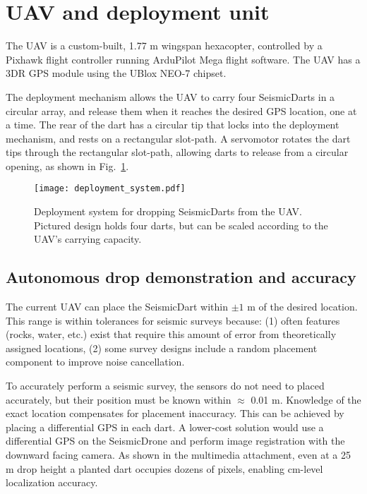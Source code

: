 \section{UAV and deployment unit}\label{sec:DeploymentUnit(UAV)}

The UAV is a custom-built, 1.77 m wingspan hexacopter, controlled by a Pixhawk flight controller running ArduPilot Mega flight software. The UAV has a 3DR GPS module using the UBlox NEO-7 chipset.


 The deployment mechanism allows the UAV to carry four SeismicDarts in a circular array, and release them when it reaches the desired GPS location, one at a time.
 The rear of the dart has a circular tip that locks into the deployment mechanism, and rests on a rectangular slot-path. 
 A servomotor rotates the dart tips through the rectangular slot-path, allowing darts to release from a circular opening,  as shown in Fig.~\ref{fig:deployment_system}.



\begin{figure} \centering
  {\texttt{[image: deployment\_system.pdf]}}
 \caption{Deployment system for dropping SeismicDarts from the UAV. Pictured design holds four darts, but can be scaled according to the UAV's carrying capacity.} 
 \label{fig:deployment_system}
\end{figure}




\subsection{Autonomous drop demonstration and accuracy}

The current UAV can place the SeismicDart within $\pm1$ m of the desired location.  
This range is within tolerances for seismic surveys because:
(1) often features (rocks, water, etc.) exist that require this amount of error from theoretically assigned locations,
(2) some survey designs include a random placement component to improve noise cancellation.

To accurately perform a seismic survey, the sensors do not need to placed accurately, but their position must be known within $\approx$ 0.01 m. 
 Knowledge of the exact location compensates for placement inaccuracy.
 This can be achieved by placing a differential GPS in each dart.  A lower-cost solution would use a differential GPS on the SeismicDrone and perform image registration with the downward facing camera.  As shown in the multimedia attachment, even at a 25 m drop height a planted dart occupies dozens of pixels, enabling cm-level localization accuracy.


